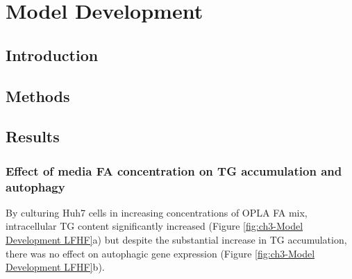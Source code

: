 \chapter{\label{ch:3-Model Development}Model Development}

\minitoc

 \section{Introduction}

 \section{Methods}

 \section{Results}

\subsection{Effect of media FA concentration on TG accumulation and autophagy}

By culturing Huh7 cells in increasing concentrations of OPLA FA mix, intracellular TG content significantly increased (Figure \ref{fig:ch3-Model Development LFHF}a) but despite the substantial increase in TG accumulation, there was no effect on autophagic gene expression (Figure \ref{fig:ch3-Model Development LFHF}b).

